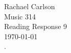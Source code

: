 \documentclass[12pt]{article}
\begin{document}
\noindent Rachael Carlson\\
Music 314\\
Reading Response 9\\
\today\\

\noindent {}.\\
\end{document}
